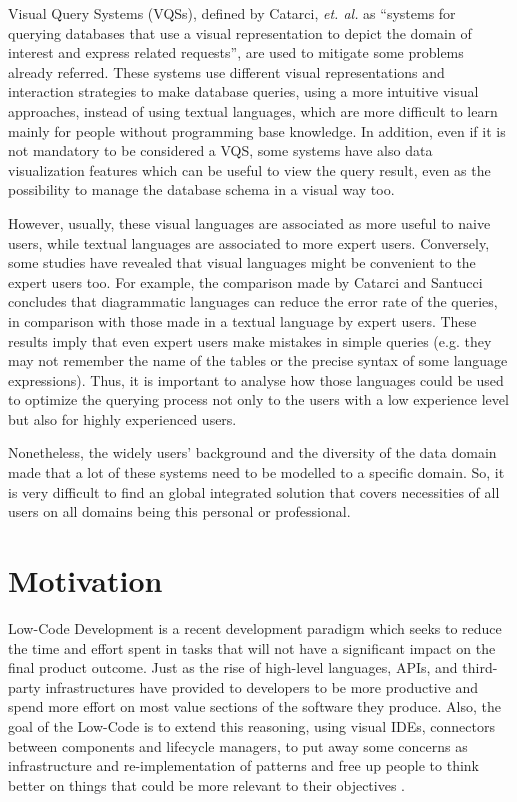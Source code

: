Visual Query Systems (VQSs), defined by Catarci, \textit{et. al.} \cite{visualQuerySystemsForDatabases_aSurvey} as “systems for querying databases that use a visual representation to depict the domain of interest and express related requests”, are used to mitigate some problems already referred. These systems use different visual representations and interaction strategies to make database queries, using a more intuitive visual approaches, instead of using textual languages, which are more difficult to learn mainly for people without programming base knowledge. In addition, even if it is not mandatory to be considered a VQS, some systems have also data visualization features which can be useful to view the query result, even as the possibility to manage the database schema in a visual way too.

However, usually, these visual languages are associated as more useful to naive users, while textual languages are associated to more expert users.  Conversely, some studies have revealed that visual languages might be convenient to the expert users too. For example, the comparison made by Catarci and Santucci \cite{diagrammaticVsTextualQueryLanguages_aComparativeExperiment} concludes that diagrammatic languages can reduce the error rate of the queries, in comparison with those made in a textual language by expert users. These results imply that even expert users make mistakes in simple queries (e.g. they may not remember the name of the tables or the precise syntax of some language expressions). Thus, it is important to analyse how those languages could be used to optimize the querying process not only to the users with a low experience level but also for highly experienced users.

 Nonetheless, the widely users’ background and the diversity of the data domain made that a lot of these systems need to be modelled to a specific domain. So, it is very difficult to find an global integrated solution that covers necessities of all users on all domains being this personal or professional.

\section{Motivation}
\label{sec:motivation}

Low-Code Development is a recent development paradigm which seeks to reduce the time and effort spent in tasks that will not have a significant impact on the final product outcome. Just as the rise of high-level languages, APIs, and third-party infrastructures have provided to developers to be more productive and spend more effort on most value sections of the software they produce. Also, the goal of the Low-Code is to extend this reasoning, using visual IDEs, connectors between components and lifecycle managers, to put away some concerns as infrastructure and re-implementation of patterns and free up people to think better on things that could be more relevant to their objectives \cite{outsystems_whatIsLowCode}.

